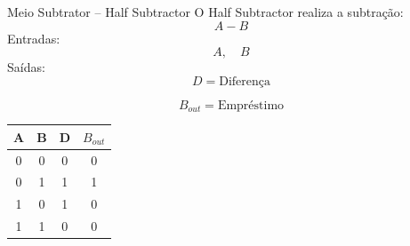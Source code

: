 \begin{frame}{Meio Subtrator -- Half Subtractor}
    O Half Subtractor realiza a subtração:
    \[
        A-B
    \]
    Entradas:
    \[
        A,\quad B
    \]
    Saídas:
    \[
        D=\text{Diferença}
    \]

    \[
        B_{out}=\text{Empréstimo}
    \]

    \begin{center}
        \begin{tabular}{c c | c c}
            \hline
            A & B & D & $B_{out}$ \\
            \hline
            0 & 0 & 0 & 0 \\
            0 & 1 & 1 & 1 \\
            1 & 0 & 1 & 0 \\
            1 & 1 & 0 & 0 \\
            \hline
        \end{tabular}
    \end{center}

\end{frame}
